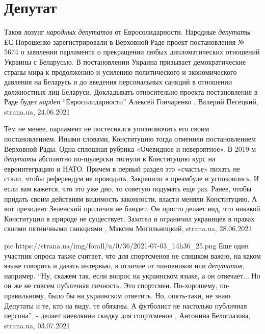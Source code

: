  
 
 
 
 
\chapter{Депутат}
\label{sec:slova.deputat}

Таков лозунг \emph{народных депутатов} от Евросолидарности.  Народные
\emph{депутаты} ЕС Порошенко зарегистрировали в Верховной Раде проект
постановления № 5674 о заявлении парламента о прекращении любых дипломатических
отношений Украины с Беларусью. В постановлении Украина призывает
демократические страны мира к продолжению и усилению политического и
экономического давления на Беларусь и до введения персональных санкций в
отношении должностных лиц Беларуси. Докладывать относительно проекта
постановления в Раде будет \emph{нардеп} \enquote{Евросолидарности} Алексей
Гончаренко
, 
Валерий Песецкий, strana.ua, 24.06.2021

Тем не менее, парламент не постеснялся уполномочить его своим постановлением.
Иными словами, Конституцию тогда отменили постановлением Верховной Рады. Одна
сплошная рубрика «Очевидное и невероятное».  В 2019-м \emph{депутаты} абсолютно
по-шулерски тиснули в Конституцию курс на евроинтеграцию и НАТО. Причем в
первый раздел это «счастье» пихать не стали, чтобы референдум не проводить.
Закрепили в преамбуле и успокоились.  И если вам кажется, что это уже дно, то
советую подумать еще раз. Ранее, чтобы придать своим действиям видимость
законности, власти меняли Конституцию. А вот президент Зеленский приличия не
блюдет. Он просто делает вид, что никакой Конституции в природе не существует.
Захотел и ограничил украинцев в правах своими пятничными санкциями
, 
Максим Могильницкий, strana.ua, 28.06.2021

\ifcmt
  pic https://strana.ua/img/forall/u/0/36/2021-07-03_14h36_25.png
\fi
Еще один участник опроса также считает, что для спортсменов не слишком важно,
на каком языке говорить и давать интервью, в отличие от чиновников или
\emph{депутатов}, например.  \enquote{Ну, скажем так, если вопрос на украинском
языке, а он отвечает... Но он же не совсем публичная личность. Это спортсмен.
По-хорошему, по-правильному, было бы на украинском ответить. Но, опять-таки, не
знаю. Депутаты и те, кто на виду, те обязаны. А футболист не настолько
публичная персона}, - делает киевлянин скидку для спортсменов
, 
Антонина Белоглазова, strana.ua, 03.07.2021


